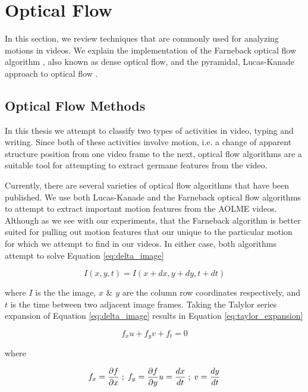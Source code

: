 \section{\label{section:activity_classification}Optical Flow}
In this section, we review techniques that are commonly used for analyzing
motions in videos. We explain the implementation of the Farneback optical flow algorithm
\cite{farneback2003two}, also known as dense optical flow, and the pyramidal,
Lucas-Kanade approach to optical flow \cite{bouguet2001pyramidal}.

\subsection{\label{section:optical_flow_methods}Optical Flow Methods}
In this thesis we attempt to classify two types of activities in video,  typing
and writing. Since both of these activities involve motion, i.e. a change of
apparent structure position from one video frame to the next, optical flow
algorithms  are a suitable tool for attempting to extract germane features from
the video.

Currently, there are several varieties of optical flow algorithms that have been
published. We use both Lucas-Kanade \cite{lucas1981iterative} and the Farneback
\cite{farneback2003two}  optical flow algorithms to attempt to extract
important motion features from the AOLME videos. Although as we see with our
experiments, that the Farneback algorithm is better suited for pulling out
motion features that our unique to the particular motion for which we attempt
to find in our videos. In either case, both algorithms attempt to solve
Equation \ref{eq:delta_image}

\begin{equation}
I(x,y,t) = I(x+dx, y+dy, t+dt)
\label{eq:delta_image}
\end{equation}

where $I$ is the the image, $x$ \& $y$ are the column row coordinates
respectively, and $t$ is the time between two adjacent image frames. Taking the
Talylor series expansion of Equation \ref{eq:delta_image} results in Equation
\ref{eq:taylor_expansion}


\begin{equation}
f_x u + f_y v + f_t = 0
\label{eq:taylor_expansion}
\end{equation}

where

\begin{equation}
f_x = \frac{\partial f}{\partial x} \; ; \; f_y = \frac{\partial f}{\partial y} \\
u = \frac{dx}{dt} \; ; \; v = \frac{dy}{dt}
\label{eq:taylor_expansion_partial}
\end{equation}

